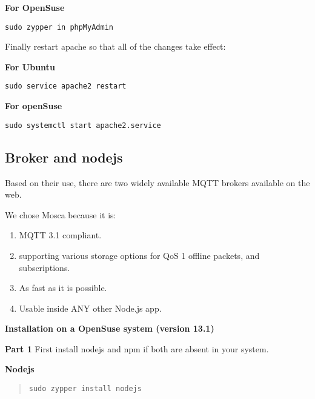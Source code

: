 \documentclass[16pt]{article}
\begin{document}
  \textbf{For OpenSuse}

  \texttt{sudo zypper in phpMyAdmin}
   \vspace{0.5cm}

  Finally restart apache so that all of the changes take effect:

  \textbf{For Ubuntu}

  \texttt{sudo service apache2 restart}

  \textbf{For openSuse}

  \texttt{sudo systemctl start apache2.service}
   \vspace{0.5cm}

 

  

\subsection{Broker and nodejs}

 \vspace{0.5cm}

Based on their use, there are two widely available MQTT brokers
available on the web. 

We chose Mosca because it is: 

\begin{enumerate}

\item MQTT 3.1 compliant.
\item supporting various storage options for QoS 1 offline packets, and subscriptions.
\item As fast as it is possible.
\item Usable inside ANY other Node.js app.

\end{enumerate}
 \vspace{0.5cm}



\textbf{Installation on a OpenSuse system (version
13.1)}

\textbf{Part 1} First install nodejs and npm if both are absent in your
system.

 
\textbf{Nodejs}

\begin{quote}
\texttt{sudo zypper install nodejs}
\end{quote}
\end{document}
